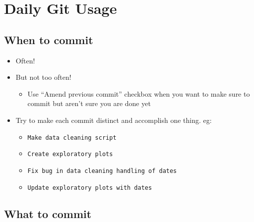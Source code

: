 \documentclass[
  letterpaper,
  DIV=11,
  numbers=noendperiod]{scrreprt}
\providecommand{\tightlist}{%
  \setlength{\itemsep}{0pt}\setlength{\parskip}{0pt}}\usepackage{longtable,booktabs,array}
\begin{document}
\hypertarget{daily-git-usage}{%
\section{Daily Git Usage}\label{daily-git-usage}}

\hypertarget{when-to-commit}{%
\subsection{When to commit}\label{when-to-commit}}

\begin{itemize}
\tightlist
\item
  Often!
\item
  But not too often!

  \begin{itemize}
  \tightlist
  \item
    Use ``Amend previous commit'' checkbox when you want to make sure to
    commit but aren't sure you are done yet
  \end{itemize}
\item
  Try to make each commit distinct and accomplish one thing. eg:

  \begin{itemize}
  \tightlist
  \item
    \texttt{Make\ data\ cleaning\ script}
  \item
    \texttt{Create\ exploratory\ plots}
  \item
    \texttt{Fix\ bug\ in\ data\ cleaning\ handling\ of\ dates}
  \item
    \texttt{Update\ exploratory\ plots\ with\ dates}
  \end{itemize}
\end{itemize}

\hypertarget{what-to-commit}{%
\subsection{What to commit}\label{what-to-commit}}
\end{document}
